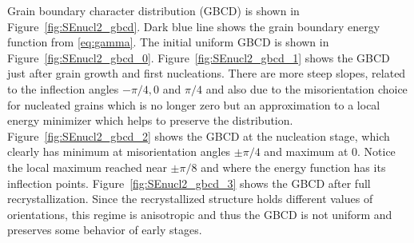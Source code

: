 Grain boundary character distribution (GBCD) is shown in Figure~\ref{fig:SEnucl2_gbcd}. 
Dark blue line shows the grain boundary energy function from \eqref{eq:gamma}. 
The initial uniform GBCD is shown in Figure~\ref{fig:SEnucl2_gbcd_0}. Figure~\ref{fig:SEnucl2_gbcd_1} shows the GBCD just after grain growth and first nucleations.
There are more steep slopes, related to the inflection angles $-\pi/4, 0$ and $\pi/4$ and also due to the misorientation choice for nucleated grains which is no longer zero but an approximation to a local energy minimizer which helps to preserve the distribution. Figure~\ref{fig:SEnucl2_gbcd_2} shows the GBCD at the nucleation stage, which clearly has minimum at misorientation angles $\pm \pi/4$ and maximum at $0$. 
Notice the local maximum reached near $\pm \pi/8$ and where the energy function has its inflection points.
Figure~\ref{fig:SEnucl2_gbcd_3} shows the GBCD after full recrystallization. 
Since the recrystallized structure holds different values of orientations, this regime is anisotropic and thus the GBCD is not uniform and preserves some behavior of early stages.


